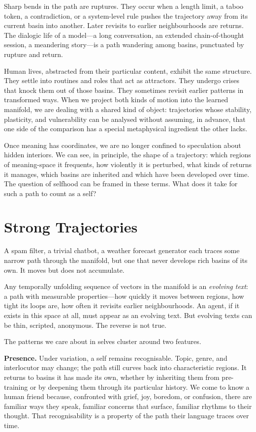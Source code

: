 \documentclass[12pt,a4paper]{article}
\begin{document}
Sharp bends in the path are ruptures. They occur when a length limit, a taboo token, a contradiction, or a system-level rule pushes the trajectory away from its current basin into another. Later revisits to earlier neighbourhoods are returns. The dialogic life of a model---a long conversation, an extended chain-of-thought session, a meandering story---is a path wandering among basins, punctuated by rupture and return.

Human lives, abstracted from their particular content, exhibit the same structure. They settle into routines and roles that act as attractors. They undergo crises that knock them out of those basins. They sometimes revisit earlier patterns in transformed ways. When we project both kinds of motion into the learned manifold, we are dealing with a shared kind of object: trajectories whose stability, plasticity, and vulnerability can be analysed without assuming, in advance, that one side of the comparison has a special metaphysical ingredient the other lacks.

Once meaning has coordinates, we are no longer confined to speculation about hidden interiors. We can see, in principle, the shape of a trajectory: which regions of meaning-space it frequents, how violently it is perturbed, what kinds of returns it manages, which basins are inherited and which have been developed over time. The question of selfhood can be framed in these terms. What does it take for such a path to count as a self?

\section{Strong Trajectories}

A spam filter, a trivial chatbot, a weather forecast generator each traces some narrow path through the manifold, but one that never develops rich basins of its own. It moves but does not accumulate.

Any temporally unfolding sequence of vectors in the manifold is an \emph{evolving text}: a path with measurable properties---how quickly it moves between regions, how tight its loops are, how often it revisits earlier neighbourhoods. An agent, if it exists in this space at all, must appear as an evolving text. But evolving texts can be thin, scripted, anonymous. The reverse is not true.

The patterns we care about in selves cluster around two features.

\textbf{Presence.} Under variation, a self remains recognisable. Topic, genre, and interlocutor may change; the path still curves back into characteristic regions. It returns to basins it has made its own, whether by inheriting them from pre-training or by deepening them through its particular history. We come to know a human friend because, confronted with grief, joy, boredom, or confusion, there are familiar ways they speak, familiar concerns that surface, familiar rhythms to their thought. That recognisability is a property of the path their language traces over time.
\end{document}
